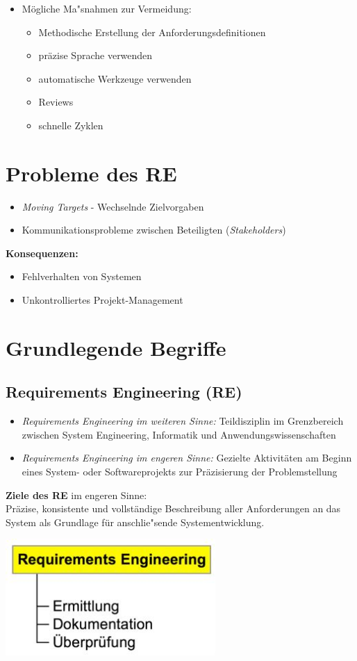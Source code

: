 \documentclass[a4paper,12pt]{article}
\begin{document}
	\begin{itemize}
		\item Mögliche Ma"snahmen zur Vermeidung:
		\begin{itemize}
			\item Methodische Erstellung der Anforderungsdefinitionen
			\item präzise Sprache verwenden
			\item automatische Werkzeuge verwenden
			\item Reviews
			\item schnelle Zyklen
		\end{itemize}
	\end{itemize}
	\section{Probleme des RE}
	\begin{itemize}
		\item \textit{Moving Targets} - Wechselnde Zielvorgaben
		\item Kommunikationsprobleme zwischen Beteiligten (\textit{Stakeholders})
	\end{itemize}
	\textbf{Konsequenzen:}
	\begin{itemize}
		\item Fehlverhalten von Systemen
		\item Unkontrolliertes Projekt-Management
	\end{itemize}

	\section{Grundlegende Begriffe}
	\subsection{Requirements Engineering (RE)}
	\begin{itemize}
		\item \textit{Requirements Engineering im weiteren Sinne:} Teildisziplin im Grenzbereich zwischen System Engineering, Informatik und Anwendungswissenschaften
		\item \textit{Requirements Engineering im engeren Sinne:} Gezielte Aktivitäten am Beginn eines System- oder Softwareprojekts zur Präzisierung der Problemstellung
	\end{itemize}
	\textbf{Ziele des RE} im engeren Sinne:\\
	Präzise, konsistente und vollständige Beschreibung aller Anforderungen an das System als Grundlage für anschlie"sende Systementwicklung.
	\begin{center}
		\includegraphics[width=8cm]{pics/re.jpg}
	\end{center}
\end{document}
